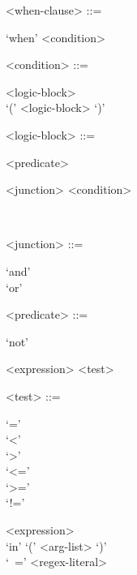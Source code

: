 \begin{grammar}
  <when-clause> ::= \begin{syntdiag}
    `when'
    <condition>
  \end{syntdiag}

  <condition> ::= \begin{syntdiag}
    \begin{stack}
      <logic-block> \\
      `(' <logic-block> `)'
    \end{stack}
  \end{syntdiag}

  <logic-block> ::= \begin{syntdiag}
    <predicate>
    \begin{stack}
      \begin{rep}<junction> <condition>\end{rep} \\
    \end{stack}
  \end{syntdiag}

  <junction> ::= \begin{syntdiag}
    \begin{stack}
      `and' \\
      `or'
    \end{stack}
  \end{syntdiag}

  <predicate> ::= \begin{syntdiag}
    \begin{stack}
      `not' \\
    \end{stack}
    <expression>
    <test>
  \end{syntdiag}

  <test> ::= \begin{syntdiag}
    \begin{stack}
      \begin{stack}
        `=' \\
        `<' \\
        `>' \\
        `<=' \\
        `>=' \\
        `!='
      \end{stack} <expression> \\
      `in' `(' <arg-list> `)' \\
      `~=' <regex-literal>
    \end{stack}
  \end{syntdiag}
\end{grammar}

